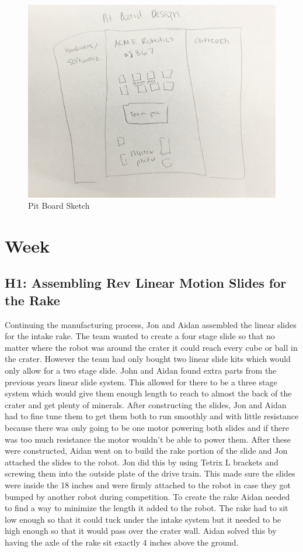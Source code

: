 \documentclass{article}
\begin{document}
\begin{figure}
    \centering
    \includegraphics[width=.6 \textwidth]{10_11-05/images/pit_board.jpg}
    \caption{Pit Board Sketch}
    \label{fig:pitboard}
\end{figure}
\clearpage \newpage \section{Week \thesection} 
\subsection{H1: Assembling Rev Linear Motion Slides for the Rake}

Continuing the manufacturing process, Jon and Aidan assembled the linear slides for the intake rake. The team wanted to create a four stage slide so that no matter where the robot was around the crater it could reach every cube or ball in the crater. However the team had only bought two linear slide kits which would only allow for a two stage slide. John and Aidan found extra parts from the previous years linear slide system. This allowed for there to be a three stage system which would give them enough length to reach to almost the back of the crater and get plenty of minerals. After constructing the slides, Jon and Aidan had to fine tune them to get them both to run smoothly and with little resistance because there was only going to be one motor powering both slides and if there was too much resistance the motor wouldn't be able to power them. After these were constructed, Aidan went on to build the rake portion of the slide and Jon attached the slides to the robot. Jon did this by using Tetrix L brackets and screwing them into the outside plate of the drive train. This made sure the slides were inside the 18 inches and were firmly attached to the robot in case they got bumped by another robot during competition. To create the rake Aidan needed to find a way to minimize the length it added to the robot. The rake had to sit low enough so that it could tuck under the intake system but it needed to be high enough so that it would pass over the crater wall. Aidan solved this by having the axle of the rake sit exactly 4 inches above the ground.
\end{document}
